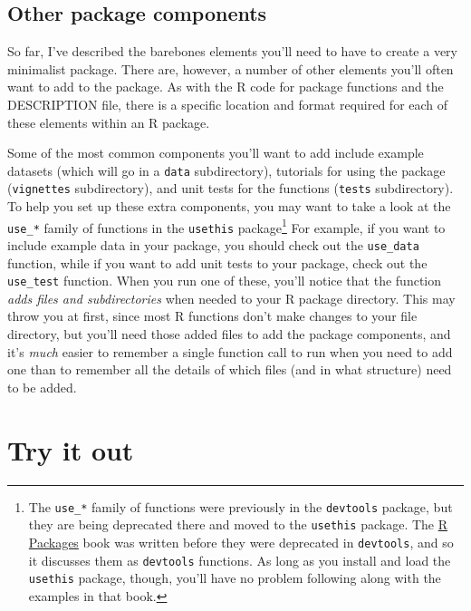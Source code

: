\documentclass[]{tufte-book}
\begin{document}
\hypertarget{other-package-components}{%
\subsection{Other package components}\label{other-package-components}}

So far, I've described the barebones elements you'll need to have to create a very
minimalist package. There are, however, a number of other elements you'll often
want to add to the package. As with the R code for package functions and the
DESCRIPTION file, there is a specific location and format required for each of
these elements within an R package.

Some of the most common components you'll want to add include example datasets
(which will go in a \texttt{data} subdirectory), tutorials for using the package
(\texttt{vignettes} subdirectory), and unit tests for the functions (\texttt{tests}
subdirectory). To help you set up these extra components, you may want to take a
look at the \texttt{use\_*} family of functions in the \texttt{usethis} \citep{R-usethis}
package\footnote{The \texttt{use\_*} family of functions were previously in the \texttt{devtools}
  package, but they are being deprecated there and moved to the \texttt{usethis} package.
  The \href{http://r-pkgs.had.co.nz/}{R Packages} book was written before they were
  deprecated in \texttt{devtools}, and so it discusses them as \texttt{devtools} functions. As
  long as you install and load the \texttt{usethis} package, though, you'll have no
  problem following along with the examples in that book.} For example, if you
want to include example data in your package, you should check out the
\texttt{use\_data} function, while if you want to add unit tests to your package, check
out the \texttt{use\_test} function. When you run one of these, you'll notice that the
function \emph{adds files and subdirectories} when needed to your R package
directory. This may throw you at first, since most R functions don't make
changes to your file directory, but you'll need those added files to add the
package components, and it's \emph{much} easier to remember a single function call to
run when you need to add one than to remember all the details of which files (and
in what structure) need to be added.

\hypertarget{try-it-out-1}{%
\section{Try it out}\label{try-it-out-1}}
\end{document}
